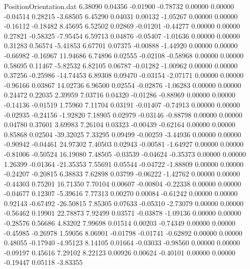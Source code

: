 \begin{filecontents}{PositionOrientation.dat}
   6.38090    0.04356   -0.01900    -0.78732    0.00000    0.00000   -0.04514    0.28215   -3.68505
   6.45290    0.04031    0.00132    -1.05267    0.00000    0.00000   -0.16112   -0.18482    8.45695
   6.52502    0.02869   -0.01201    -0.44277    0.00000    0.00000    0.27821   -0.58325   -7.95454
   6.59713    0.04876   -0.05407    -1.01636    0.00000    0.00000    0.31283    0.56574   -5.41853
   6.67701    0.07375   -0.00888    -1.44920    0.00000    0.00000   -0.66982   -0.16967   11.94686
   6.74896    0.02555   -0.02108    -0.58968    0.00000    0.00000    0.58695    0.11467   -5.82532
   6.82105    0.06787   -0.01282    -1.00962    0.00000    0.00000    0.37256   -0.25986  -14.74453
   6.89308    0.09470   -0.03154    -2.07171    0.00000    0.00000   -0.96166    0.03867   14.02736
   6.96500    0.02554   -0.02876    -1.06283    0.00000    0.00000    0.24472    0.22035    2.39959
   7.03716    0.04320   -0.01286    -0.88969    0.00000    0.00000   -0.14136   -0.01519    1.75960
   7.11704    0.03191   -0.01407    -0.74913    0.00000    0.00000   -0.02935   -0.24156   -1.92820
   7.18905    0.02979   -0.03146    -0.88798    0.00000    0.00000    0.04780    0.37601    3.69983
   7.26104    0.03323   -0.00439    -0.62164    0.00000    0.00000    0.85868    0.02504  -39.32025
   7.33295    0.09499   -0.00259    -3.44936    0.00000    0.00000   -0.90942   -0.04461   24.97302
   7.40503    0.02943   -0.00581    -1.64927    0.00000    0.00000   -0.81006   -0.50524   16.19080
   7.48505   -0.03539   -0.04624    -0.35373    0.00000    0.00000    1.26399   -0.01364  -21.35353
   7.55691    0.05544   -0.04722    -1.88809    0.00000    0.00000   -0.24207   -0.20815    6.38833
   7.62898    0.03799   -0.06222    -1.42762    0.00000    0.00000   -0.44303    0.75201   16.71350
   7.70104    0.00607   -0.00804    -0.22338    0.00000    0.00000   -0.04677    0.12307   -5.39616
   7.77313    0.00270    0.00084    -0.61242    0.00000    0.00000    0.92143   -0.67492  -26.50815
   7.85305    0.07633   -0.05310    -2.73079    0.00000    0.00000   -0.56462    0.19901   22.78873
   7.92499    0.03571   -0.03878    -1.09136    0.00000    0.00000   -0.28576    0.56686    4.83202
   7.99698    0.01514    0.00203    -0.74349    0.00000    0.00000   -0.45985   -0.26978    1.59056
   8.06901   -0.01798   -0.01741    -0.62892    0.00000    0.00000    0.48055   -0.17940   -4.95123
   8.14105    0.01664   -0.03033    -0.98560    0.00000    0.00000   -0.09197    0.45616    7.29102
   8.22123    0.00926    0.00624    -0.40101    0.00000    0.00000   -0.19447    0.05118   -3.83355

\end{filecontents}
